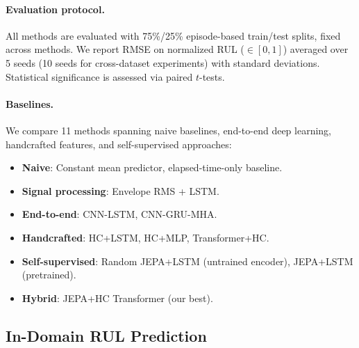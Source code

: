 \paragraph{Evaluation protocol.} All methods are evaluated with 75\%/25\% episode-based train/test splits, fixed across methods. We report RMSE on normalized RUL ($\in [0, 1]$) averaged over 5 seeds (10 seeds for cross-dataset experiments) with standard deviations. Statistical significance is assessed via paired $t$-tests.

\paragraph{Baselines.} We compare 11 methods spanning naive baselines, end-to-end deep learning, handcrafted features, and self-supervised approaches:
\begin{itemize}[nosep]
  \item \textbf{Naive}: Constant mean predictor, elapsed-time-only baseline.
  \item \textbf{Signal processing}: Envelope RMS + LSTM.
  \item \textbf{End-to-end}: CNN-LSTM, CNN-GRU-MHA.
  \item \textbf{Handcrafted}: HC+LSTM, HC+MLP, Transformer+HC.
  \item \textbf{Self-supervised}: Random JEPA+LSTM (untrained encoder), JEPA+LSTM (pretrained).
  \item \textbf{Hybrid}: JEPA+HC Transformer (our best).
\end{itemize}

\subsection{In-Domain RUL Prediction}
\label{sec:indomain}

